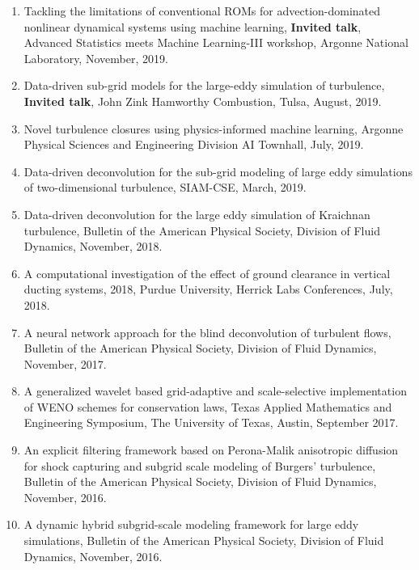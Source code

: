 \documentclass[letterpaper]{article}
\begin{document}
\begin{enumerate}
\item Tackling the limitations of conventional ROMs for advection-dominated nonlinear dynamical systems using machine learning, \textbf{Invited talk}, Advanced Statistics meets Machine Learning-III workshop, Argonne National Laboratory, November, 2019.

\item Data-driven sub-grid models for the large-eddy simulation of turbulence, \textbf{Invited talk}, John Zink Hamworthy Combustion, Tulsa, August, 2019.

\item Novel turbulence closures using physics-informed machine learning, Argonne Physical Sciences and Engineering Division AI Townhall, July, 2019. 

\item Data-driven deconvolution for the sub-grid modeling of large eddy simulations of two-dimensional turbulence, SIAM-CSE, March, 2019.

\item Data-driven deconvolution for the large eddy simulation of Kraichnan turbulence, Bulletin of the American Physical Society, Division of Fluid Dynamics, November, 2018.

\item A computational investigation of the effect of ground clearance in vertical ducting systems, 2018, Purdue University, Herrick Labs Conferences, July, 2018. 

\item A neural network approach for the blind deconvolution of turbulent flows, Bulletin of the American Physical Society, Division of Fluid Dynamics, November, 2017.

\item A generalized wavelet based grid-adaptive and scale-selective implementation of WENO schemes for conservation laws, Texas Applied Mathematics and Engineering Symposium, The University of Texas, Austin, September 2017.

\item An explicit filtering framework based on Perona-Malik anisotropic diffusion for shock capturing and subgrid scale modeling of Burgers' turbulence, Bulletin of the American Physical Society, Division of Fluid Dynamics, November, 2016.

\item A dynamic hybrid subgrid-scale modeling framework for large eddy simulations, Bulletin of the American Physical Society, Division of Fluid Dynamics, November, 2016.

\end{enumerate}
\end{document}
